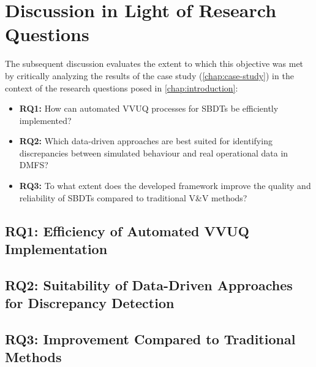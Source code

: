 \section{Discussion in Light of Research Questions}
\label{sec:discussion_rqs}
The subsequent discussion evaluates the extent to which this objective was met by critically analyzing the results of the case study (\autoref{chap:case-study}) in the context of the research questions posed in \autoref{chap:introduction}:
\begin{itemize}
  \item \textbf{RQ1:} How can automated VVUQ processes for SBDTs be efficiently implemented?
  \item \textbf{RQ2:} Which data-driven approaches are best suited for identifying discrepancies between simulated behaviour and real operational data in DMFS?
  \item \textbf{RQ3:} To what extent does the developed framework improve the quality and reliability of SBDTs compared to traditional V&V methods?
\end{itemize}

\subsection{RQ1: Efficiency of Automated VVUQ Implementation}
\label{sec:discussion_rq1}

\subsection{RQ2: Suitability of Data-Driven Approaches for Discrepancy Detection}
\label{sec:discussion_rq2}

\subsection{RQ3: Improvement Compared to Traditional Methods}
\label{sec:discussion_rq3}

